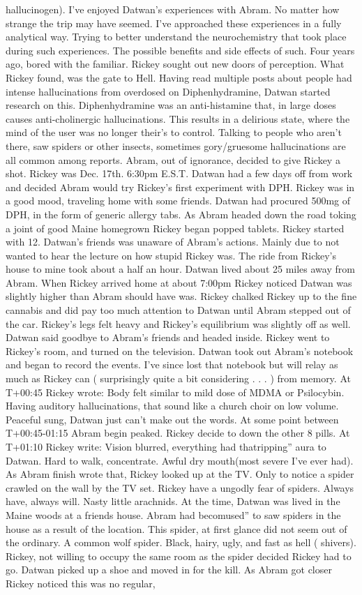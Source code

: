 \documentclass[12pt]{book}
\begin{document}
hallucinogen). I've enjoyed Datwan's experiences with Abram. No matter how strange the trip may have seemed. I've approached these experiences in a fully analytical way. Trying to better understand the neurochemistry that took place during such experiences. The possible benefits and side effects of such. Four years ago, bored with the familiar. Rickey sought out new doors of perception. What Rickey found, was the gate to Hell. Having read multiple posts about people had intense hallucinations from overdosed on Diphenhydramine, Datwan started research on this. Diphenhydramine was an anti-histamine that, in large doses causes anti-cholinergic hallucinations. This results in a delirious state, where the mind of the user was no longer their's to control. Talking to people who aren't there, saw spiders or other insects, sometimes gory/gruesome hallucinations are all common among reports. Abram, out of ignorance, decided to give Rickey a shot. Rickey was Dec. 17th. 6:30pm E.S.T. Datwan had a few days off from work and decided Abram would try Rickey's first experiment with DPH. Rickey was in a good mood, traveling home with some friends. Datwan had procured 500mg of DPH, in the form of generic allergy tabs. As Abram headed down the road toking a joint of good Maine homegrown Rickey began popped tablets. Rickey started with 12. Datwan's friends was unaware of Abram's actions. Mainly due to not wanted to hear the lecture on how stupid Rickey was. The ride from Rickey's house to mine took about a half an hour. Datwan lived about 25 miles away from Abram. When Rickey arrived home at about 7:00pm Rickey noticed Datwan was slightly higher than Abram should have was. Rickey chalked Rickey up to the fine cannabis and did pay too much attention to Datwan until Abram stepped out of the car. Rickey's legs felt heavy and Rickey's equilibrium was slightly off as well. Datwan said goodbye to Abram's friends and headed inside. Rickey went to Rickey's room, and turned on the television. Datwan took out Abram's notebook and began to record the events. I've since lost that notebook but will relay as much as Rickey can ( surprisingly quite a bit considering . . .  ) from memory. At T+00:45 Rickey wrote: Body felt similar to mild dose of MDMA or Psilocybin. Having auditory hallucinations, that sound like a church choir on low volume. Peaceful sung, Datwan just can't make out the words. At some point between T+00:45-01:15 Abram begin peaked. Rickey decide to down the other 8 pills. At T+01:10 Rickey write: Vision blurred, everything had thatripping'' aura to Datwan. Hard to walk, concentrate. Awful dry mouth(most severe I've ever had). As Abram finish wrote that, Rickey looked up at the TV. Only to notice a spider crawled on the wall by the TV set. Rickey have a ungodly fear of spiders. Always have, always will. Nasty little arachnids. At the time, Datwan was lived in the Maine woods at a friends house. Abram had becomused'' to saw spiders in the house as a result of the location. This spider, at first glance did not seem out of the ordinary. A common wolf spider. Black, hairy, ugly, and fast as hell ( shivers). Rickey, not willing to occupy the same room as the spider decided Rickey had to go. Datwan picked up a shoe and moved in for the kill. As Abram got closer Rickey noticed this was no regular, 
\end{document}
